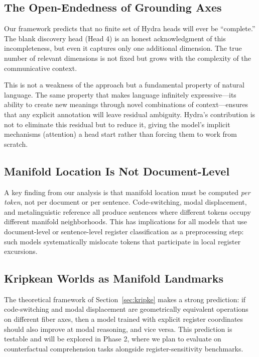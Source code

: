 \documentclass[11pt]{article}
\begin{document}
\subsection{The Open-Endedness of Grounding Axes}

Our framework predicts that no finite set of Hydra heads will ever be 
``complete.'' The blank discovery head (Head 4) is an honest acknowledgment 
of this incompleteness, but even it captures only one additional dimension. 
The true number of relevant dimensions is not fixed but grows with the 
complexity of the communicative context.

This is not a weakness of the approach but a fundamental property of 
natural language. The same property that makes language infinitely expressive---its 
ability to create new meanings through novel combinations of context---ensures 
that any explicit annotation will leave residual ambiguity. Hydra's contribution 
is not to eliminate this residual but to reduce it, giving the model's 
implicit mechanisms (attention) a head start rather than forcing them to 
work from scratch.

\subsection{Manifold Location Is Not Document-Level}

A key finding from our analysis is that manifold location must be computed 
\emph{per token}, not per document or per sentence. Code-switching, modal 
displacement, and metalinguistic reference all produce sentences where 
different tokens occupy different manifold neighborhoods. This has 
implications for all models that use document-level or sentence-level 
register classification as a preprocessing step: such models systematically 
mislocate tokens that participate in local register excursions.

\subsection{Kripkean Worlds as Manifold Landmarks}

The theoretical framework of Section~\ref{sec:kripke} makes a strong 
prediction: if code-switching and modal displacement are geometrically 
equivalent operations on different fiber axes, then a model trained with 
explicit register coordinates should also improve at modal reasoning, and 
vice versa. This prediction is testable and will be explored in Phase 2, 
where we plan to evaluate on counterfactual comprehension tasks alongside 
register-sensitivity benchmarks.
\end{document}
